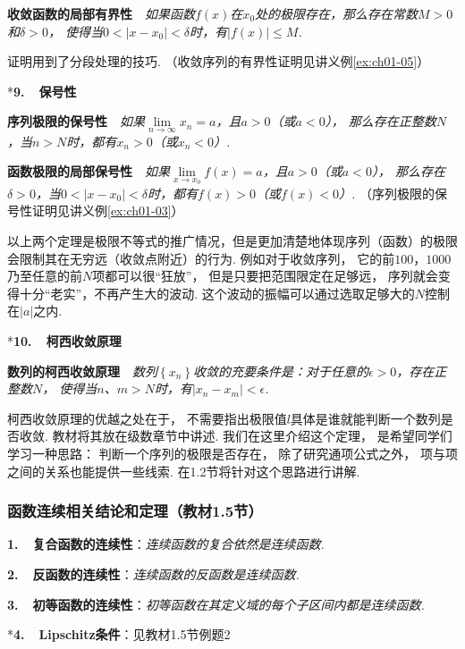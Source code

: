 \textbf{收敛函数的局部有界性}~~\textit{如果函数$f(x)$在$x_{0}$处的极限存在，那么存在常数$M>0$和$\delta >0$，
使得当$0<|x-x_{0}|<\delta$时，有$|f(x)|\le M$.}

证明用到了分段处理的技巧. （收敛序列的有界性证明见讲义例\ref{ex:ch01-05}）\vspace{0.5em}

*\textbf{9.~~保号性}\vspace{0.25em}

\textbf{序列极限的保号性}~~\textit{如果$\lim\limits_{n \to \infty}x_{n}=a$，且$a>0$（或$a<0$），
那么存在正整数$N$，当$n>N$时，都有$x_{n}>0$（或$x_{n}<0$）.}

\textbf{函数极限的局部保号性}~~\textit{如果$\lim\limits_{x \to x_{0}}f(x)=a$，且$a>0$（或$a<0$），
那么存在$\delta>0$，当$0<|x-x_{0}|<\delta$时，都有$f(x)>0$（或$f(x)<0$）.}
（序列极限的保号性证明见讲义例\ref{ex:ch01-03}）\vspace{0.5em}

以上两个定理是极限不等式的推广情况，但是更加清楚地体现序列（函数）的极限会限制其在无穷远（收敛点附近）的行为.
例如对于收敛序列，
它的前$100$，$1000$乃至任意的前$N$项都可以很“狂放”，
但是只要把范围限定在足够远，
序列就会变得十分“老实”，不再产生大的波动.
这个波动的振幅可以通过选取足够大的$N$控制在$|a|$之内.\vspace{0.5em}

*\textbf{10.~~柯西收敛原理}\vspace{0.25em}

\textbf{数列的柯西收敛原理}~~\textit{数列$\left \{ x_{n} \right \}$收敛的充要条件是：对于任意的$\epsilon>0$，存在正整数$N$，
使得当$n$、$m>N$时，有$|x_{n}-x_{m}|<\epsilon$.}

柯西收敛原理的优越之处在于，
不需要指出极限值$l$具体是谁就能判断一个数列是否收敛.
教材将其放在级数章节中讲述.
我们在这里介绍这个定理，
是希望同学们学习一种思路：
判断一个序列的极限是否存在，
除了研究通项公式之外，
项与项之间的关系也能提供一些线索.
在1.2节将针对这个思路进行讲解.

\subsubsection{函数连续相关结论和定理（教材1.5节）}
\textbf{1.~~复合函数的连续性}：\textit{连续函数的复合依然是连续函数.}\par
\textbf{2.~~反函数的连续性}：\textit{连续函数的反函数是连续函数.}\par
\textbf{3.~~初等函数的连续性}：\textit{初等函数在其定义域的每个子区间内都是连续函数.}\par
*\textbf{4.~~Lipschitz条件}：见教材1.5节例题2\par

